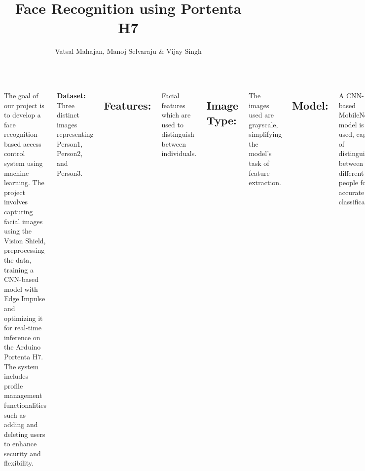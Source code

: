 \documentclass[25pt,a0paper, portrait]{tikzposter}
\title{Face Recognition using Portenta H7}
\author{Vatsal Mahajan, Manoj Selvaraju \& Vijay Singh}
\begin{document}
	
	\maketitle
	
	\begin{columns} 
		
		
		{
			
			The goal of our project is to develop a face recognition-based access control system using machine learning. The project involves capturing facial images using the Vision Shield, preprocessing the data, training a CNN-based model with Edge Impulse and optimizing it for real-time inference on the Arduino Portenta H7. The system includes profile management functionalities such as adding and deleting users to enhance security and flexibility.
			
		}
		
		{
			\textbf{Dataset:}
			Three distinct images representing Person1, Person2, and Person3.
			
			\subsection*{Features:}
			Facial features which are used to distinguish between individuals.
			
			\subsection*{Image Type:}
			The images used are grayscale, simplifying the model’s task of feature extraction.
			
			\subsection*{Model:}
			A CNN-based MobileNetV2 model is used, capable of distinguishing between different people for accurate classification.
			
			\subsection*{Hardware:}
			The system uses an Arduino Portenta H7, Vision Shield and a USB-C cable to facilitate the recognition process.
			
			\subsection*{Software:}
			Arduino IDE, Edge Impulse CLI, Python and Node.js for implementing and deploying the model.
			
}
\end{columns}
\end{document}
